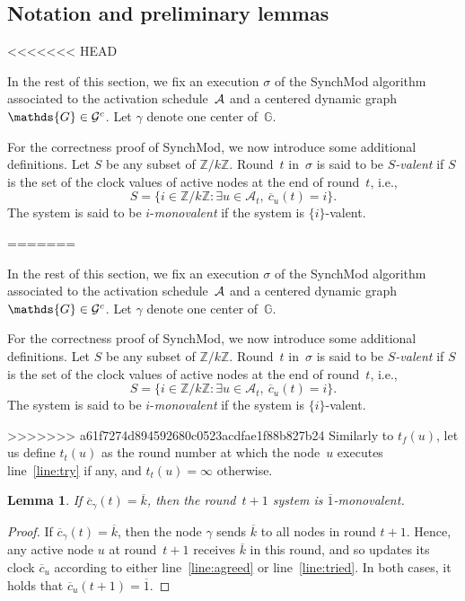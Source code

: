 \documentclass{article}
\newtheorem{lemma}{Lemma}[section]
\newcommand{\cent}{\gamma}
\newcommand{\dG}{\mathds{G}}
\newcommand{\tf}{t_{f}}
\newcommand{\try}{t_{t}}
\begin{document}
\subsection{Notation and preliminary lemmas}
<<<<<<< HEAD

In the rest of this section, we fix an execution $\sigma$ of the SynchMod algorithm associated to the activation 
	schedule~${\cal A}$ and a centered dynamic graph~$\dG \in {\cal G}^c$. %
Let $\cent$ denote one center of~$\dG$.	

For the correctness proof of SynchMod, we now introduce some additional definitions.
Let $S$ be any subset of $ \mathds{Z}/k\mathds{Z}$.
Round~$t$ in~$\sigma$  is said to be \emph{$S$-valent}  if $S$ is the set of the clock values of active nodes at the end of round~$t$, i.e.,
	$$ S = \{i  \in \mathds{Z}/k\mathds{Z} : \exists u \in \mathcal{A}_t, \ \overline{c}_u (t) = i \}  . $$
The system is said to be $i$-\emph{monovalent}  if the system is $\{ i\}$-valent.

=======

In the rest of this section, we fix an execution $\sigma$ of the SynchMod algorithm associated to the activation 
	schedule~${\cal A}$ and a centered dynamic graph~$\dG \in {\cal G}^c$. %
Let $\cent$ denote one center of~$\dG$.	

For the correctness proof of SynchMod, we now introduce some additional definitions.
Let $S$ be any subset of $ \mathds{Z}/k\mathds{Z}$.
Round~$t$ in~$\sigma$  is said to be \emph{$S$-valent}  if $S$ is the set of the clock values of active nodes at the end of round~$t$, i.e.,
	$$ S = \{i  \in \mathds{Z}/k\mathds{Z} : \exists u \in \mathcal{A}_t, \ \overline{c}_u (t) = i \}  . $$
The system is said to be $i$-\emph{monovalent}  if the system is $\{ i\}$-valent.

>>>>>>> a61f7274d894592680c0523acdfae1f88b827b24
Similarly to $\tf (u)$, let us define $\try (u)$  as the round number at which the node~$u$ executes line~\ref{line:try} 
	if any, and $\try (u)= \infty$ otherwise.

\begin{lemma}\label{lem:k_mono}
If $\overline{c}_\cent(t) = \overline{k} $, then the round~$t +1$ system is $\overline{1}$-monovalent.
\end{lemma}

\begin{proof}
If $\overline{c}_\cent(t) = \overline{k} $, then the node $\cent$ sends $\overline{k}$ to all nodes in round $t+1$.
Hence, any active node $u$ at round~$t+1$ receives $\overline{k}$ in this round,
	and so updates its clock $\overline{c}_u$ according to either line~\ref{line:agreed} or line~\ref{line:tried}.
In both cases, it holds that $\overline{c}_u (t+1) =\overline{1}$.
\end{proof}
\end{document}
